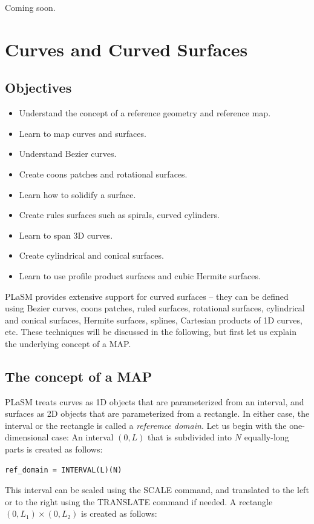 \documentclass{article}
\begin{document}
Coming soon.

\section{Curves and Curved Surfaces}\label{sec:curves}

\subsection{Objectives}
\begin{itemize}
\item Understand the concept of a reference geometry and reference map.
\item Learn to map curves and surfaces.
\item Understand Bezier curves.
\item Create coons patches and rotational surfaces.
\item Learn how to solidify a surface.
\item Create rules surfaces such as spirals, curved cylinders.
\item Learn to span 3D curves.
\item Create cylindrical and conical surfaces.
\item Learn to use profile product surfaces and cubic Hermite surfaces.
\end{itemize}
PLaSM provides extensive support for curved surfaces -- they can be defined
using Bezier curves, coons patches, ruled surfaces, rotational surfaces, 
cylindrical and conical surfaces, Hermite surfaces, 
splines, Cartesian products of 1D curves, etc. These techniques will be 
discussed in the following, but first let us explain the underlying 
concept of a MAP.

\subsection{The concept of a MAP}

PLaSM treats curves as 1D objects that are parameterized from an interval,
and surfaces as 2D objects that are parameterized from a rectangle. In either
case, the interval or the rectangle is called a {\em referemce domain}. Let 
us begin with the one-dimensional case: An interval $(0, L)$ that is subdivided 
into $N$ equally-long parts is created as follows:

\begin{verbatim}
ref_domain = INTERVAL(L)(N)
\end{verbatim}
This interval can be scaled using the SCALE command, and translated to the left or to the 
right using the TRANSLATE command if needed. A rectangle $(0, L_1) \times (0, L_2)$ is 
created as follows:
\end{document}
